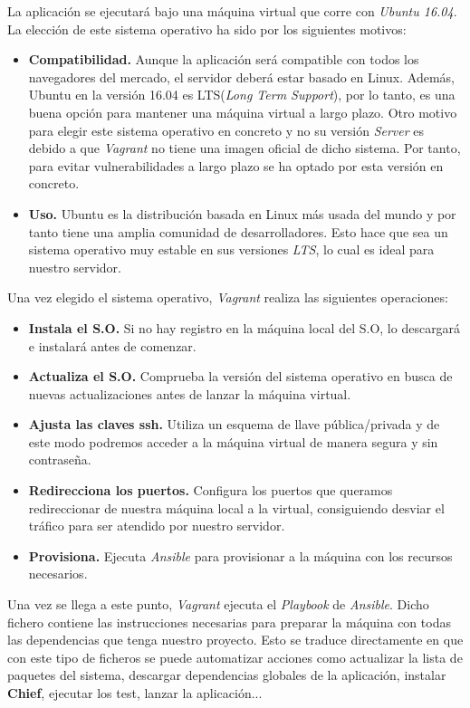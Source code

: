 La aplicación se ejecutará bajo una máquina virtual que corre con \textit{Ubuntu 16.04}. La elección de este sistema operativo ha sido por los siguientes motivos:
\begin{itemize}
	\item \textbf{Compatibilidad.} Aunque la aplicación será compatible con todos los navegadores del mercado, el servidor deberá estar basado en Linux. Además, 
	Ubuntu en la versión 16.04 es LTS(\textit{Long Term Support}), por lo tanto, es una buena opción para mantener una máquina virtual a largo plazo. Otro motivo para
	elegir este sistema operativo en concreto y no su versión \textit{Server} es debido a que \textit{Vagrant} no tiene una imagen oficial de dicho sistema. Por tanto,
	para evitar vulnerabilidades a largo plazo se ha optado por esta versión en concreto.
	
	\item \textbf{Uso.} Ubuntu es la distribución basada en Linux más usada del mundo\cite{ubuntu-usage} y por tanto tiene una amplia comunidad de desarrolladores. Esto
	hace que sea un sistema operativo muy estable en sus versiones \textit{LTS}, lo cual es ideal para nuestro servidor.
\end{itemize}

Una vez elegido el sistema operativo, \textit{Vagrant} realiza las siguientes operaciones:

\begin{itemize}
	\item \textbf{Instala el S.O.} Si no hay registro en la máquina local del S.O, lo descargará e instalará antes de comenzar.
	\item \textbf{Actualiza el S.O.} Comprueba la versión del sistema operativo en busca de nuevas actualizaciones antes de lanzar la máquina virtual.
	\item \textbf{Ajusta las claves ssh.} Utiliza un esquema de llave pública/privada y de este modo podremos acceder a la máquina virtual de manera segura y sin contraseña.
	\item \textbf{Redirecciona los puertos.} Configura los puertos que queramos redireccionar de nuestra máquina local a la virtual, consiguiendo desviar el tráfico 
	para ser atendido por nuestro servidor.
	\item \textbf{Provisiona.} Ejecuta \textit{Ansible} para provisionar a la máquina con los recursos necesarios.
\end{itemize}

Una vez se llega a este punto, \textit{Vagrant} ejecuta el \textit{Playbook} de \textit{Ansible}. Dicho fichero contiene las instrucciones necesarias para 
preparar la máquina con todas las dependencias que tenga nuestro proyecto. Esto se traduce directamente en que con este tipo de ficheros se puede automatizar acciones
como actualizar la lista de paquetes del sistema, descargar dependencias globales de la aplicación, instalar \textbf{Chief}, ejecutar los test, lanzar la aplicación...\\


